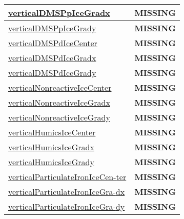 {\begin{center}
\begin{longtable}{| p{2.0in} | p{4.0in} |}
    \hline
    \hyperref[subsec:var_sec_tracer_reconstruction_verticalDMSPpIceGradx]{verticalDMSPpIceGradx} & {\bf \color{red} MISSING} \\
    \hline
    \hyperref[subsec:var_sec_tracer_reconstruction_verticalDMSPpIceGrady]{verticalDMSPpIceGrady} & {\bf \color{red} MISSING} \\
    \hline
    \hyperref[subsec:var_sec_tracer_reconstruction_verticalDMSPdIceCenter]{verticalDMSPdIceCenter} & {\bf \color{red} MISSING} \\
    \hline
    \hyperref[subsec:var_sec_tracer_reconstruction_verticalDMSPdIceGradx]{verticalDMSPdIceGradx} & {\bf \color{red} MISSING} \\
    \hline
    \hyperref[subsec:var_sec_tracer_reconstruction_verticalDMSPdIceGrady]{verticalDMSPdIceGrady} & {\bf \color{red} MISSING} \\
    \hline
    \hyperref[subsec:var_sec_tracer_reconstruction_verticalNonreactiveIceCenter]{verticalNonreactiveIceCenter} & {\bf \color{red} MISSING} \\
    \hline
    \hyperref[subsec:var_sec_tracer_reconstruction_verticalNonreactiveIceGradx]{verticalNonreactiveIceGradx} & {\bf \color{red} MISSING} \\
    \hline
    \hyperref[subsec:var_sec_tracer_reconstruction_verticalNonreactiveIceGrady]{verticalNonreactiveIceGrady} & {\bf \color{red} MISSING} \\
    \hline
    \hyperref[subsec:var_sec_tracer_reconstruction_verticalHumicsIceCenter]{verticalHumicsIceCenter} & {\bf \color{red} MISSING} \\
    \hline
    \hyperref[subsec:var_sec_tracer_reconstruction_verticalHumicsIceGradx]{verticalHumicsIceGradx} & {\bf \color{red} MISSING} \\
    \hline
    \hyperref[subsec:var_sec_tracer_reconstruction_verticalHumicsIceGrady]{verticalHumicsIceGrady} & {\bf \color{red} MISSING} \\
    \hline
    \hyperref[subsec:var_sec_tracer_reconstruction_verticalParticulateIronIceCenter]{verticalParticulateIronIceCen-}\hyperref[subsec:var_sec_tracer_reconstruction_verticalParticulateIronIceCenter]{ter  }& {\bf \color{red} MISSING} \\
    \hline
    \hyperref[subsec:var_sec_tracer_reconstruction_verticalParticulateIronIceGradx]{verticalParticulateIronIceGra-}\hyperref[subsec:var_sec_tracer_reconstruction_verticalParticulateIronIceGradx]{dx  }& {\bf \color{red} MISSING} \\
    \hline
    \hyperref[subsec:var_sec_tracer_reconstruction_verticalParticulateIronIceGrady]{verticalParticulateIronIceGra-}\hyperref[subsec:var_sec_tracer_reconstruction_verticalParticulateIronIceGrady]{dy  }& {\bf \color{red} MISSING} \\

\end{longtable}
\end{center}}

